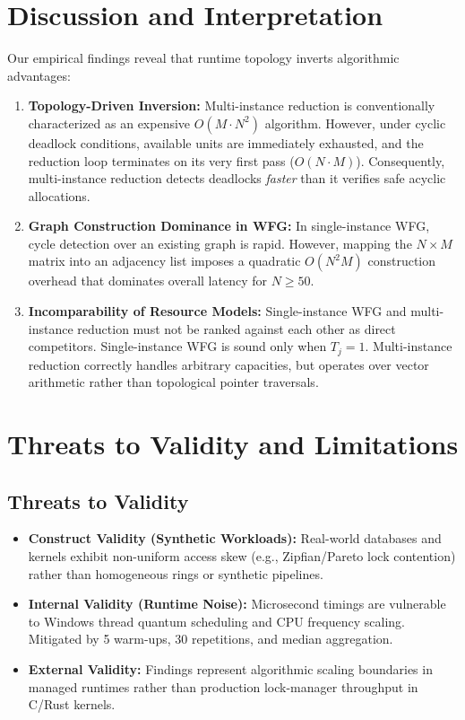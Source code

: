 \documentclass[11pt,a4paper]{article}
\begin{document}
\section{Discussion and Interpretation}
Our empirical findings reveal that runtime topology inverts algorithmic advantages:
\begin{enumerate}
    \item \textbf{Topology-Driven Inversion:} Multi-instance reduction is conventionally characterized as an expensive $O(M \cdot N^2)$ algorithm. However, under cyclic deadlock conditions, available units are immediately exhausted, and the reduction loop terminates on its very first pass ($O(N \cdot M)$). Consequently, multi-instance reduction detects deadlocks \emph{faster} than it verifies safe acyclic allocations.
    \item \textbf{Graph Construction Dominance in WFG:} In single-instance WFG, cycle detection over an existing graph is rapid. However, mapping the $N \times M$ matrix into an adjacency list imposes a quadratic $O(N^2 M)$ construction overhead that dominates overall latency for $N \ge 50$.
    \item \textbf{Incomparability of Resource Models:} Single-instance WFG and multi-instance reduction must not be ranked against each other as direct competitors. Single-instance WFG is sound only when $T_j = 1$. Multi-instance reduction correctly handles arbitrary capacities, but operates over vector arithmetic rather than topological pointer traversals.
\end{enumerate}

\section{Threats to Validity and Limitations}

\subsection{Threats to Validity}
\begin{itemize}
    \item \textbf{Construct Validity (Synthetic Workloads):} Real-world databases and kernels exhibit non-uniform access skew (e.g., Zipfian/Pareto lock contention) rather than homogeneous rings or synthetic pipelines.
    \item \textbf{Internal Validity (Runtime Noise):} Microsecond timings are vulnerable to Windows thread quantum scheduling and CPU frequency scaling. Mitigated by 5 warm-ups, 30 repetitions, and median aggregation.
    \item \textbf{External Validity:} Findings represent algorithmic scaling boundaries in managed runtimes rather than production lock-manager throughput in C/Rust kernels.
\end{itemize}
\end{document}
